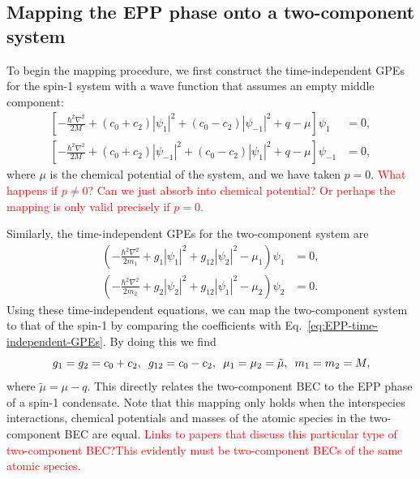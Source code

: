 \subsection{Mapping the EPP phase onto a two-component system}
To begin the mapping procedure, we first construct the time-independent
GPEs for the spin-1 system with a wave function that assumes an empty middle
component:
\begin{equation}
    \begin{aligned}
        \left[-\frac{\hbar^2\nabla^2}{2M}
        + (c_0 + c_2)|\psi_1|^2 + (c_0 - c_2)|\psi_{-1}|^2 
        + q - \mu\right]\psi_1 &= 0, \\
        \left[-\frac{\hbar^2\nabla^2}{2M}
        + (c_0 + c_2)|\psi_{-1}|^2 + (c_0 - c_2)|\psi_1|^2 
        + q - \mu\right]\psi_{-1} &= 0,
    \end{aligned}
    \label{eq:EPP-time-independent-GPEs}
\end{equation}
where \( \mu \) is the chemical potential of the system, and we have taken
\( p=0 \).
\textcolor{red}{What happens if \(p \neq 0\)? Can we just absorb into chemical
potential? Or perhaps the mapping is only valid precisely if \(p = 0\).}

Similarly, the time-independent GPEs for the two-component system are
\begin{equation}
    \begin{aligned}
        \left(-\frac{\hbar^2\nabla^2}{2m_1} + g_1|\psi_1|^2
        +g_{12}|\psi_2|^2 - \mu_1\right)\psi_1 &= 0, \\
        \left(-\frac{\hbar^2\nabla^2}{2m_2} + g_2|\psi_2|^2
        +g_{12}|\psi_1|^2 - \mu_2\right)\psi_2 &= 0.
    \end{aligned}
    \label{eq:two-comp-time-independent-gpes}
\end{equation}
Using these time-independent equations, we can map the two-component system
to that of the spin-1 by comparing the coefficients with
Eq.~\eqref{eq:EPP-time-independent-GPEs}.
By doing this we find
\begin{equation}
    g_1=g_2=c_0+c_2, \enskip g_{12} = c_0-c_2, \enskip \mu_1=\mu_2=\tilde{\mu}, 
    \enskip m_1=m_2=M,
\end{equation}
where \( \tilde{\mu} = \mu - q \).
This directly relates the two-component BEC to the EPP phase of a spin-1
condensate.
Note that this mapping only holds when the interspecies interactions, chemical
potentials and masses of the atomic species in the two-component BEC are equal.
\textcolor{red}{Links to papers that discuss this particular type of
two-component BEC?\@ This evidently must be two-component BECs of the same atomic
species.}


